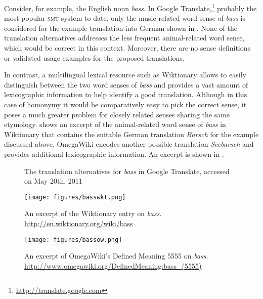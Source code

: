 \documentclass[output=paper]{LSP/langsci}
\begin{document}
 Consider, for example, the English noun \textit{bass}. In Google Translate,\footnote{\url{http://translate.google.com}} probably the most popular \textsc{smt} system to date, only the music-related word sense of \textit{bass} is considered for the example translation into German shown in . None of the translation alternatives addresses the less frequent animal-related word sense, which would be correct in this context. Moreover, there are no sense definitions or validated usage examples for the proposed translations.

In contrast, a multilingual lexical resource such as Wiktionary allows to easily distinguish between the two word senses of \textit{bass} and provides a vast amount of lexicographic information to help identify a good translation.  Although in this case of homonymy it would be comparatively easy to pick the correct sense, it poses a much greater problem for closely related senses sharing the same etymology.  shows an excerpt of the animal-related word sense of \textit{bass} in Wiktionary that contains the suitable German translation \textit{Barsch} for the example discussed above. OmegaWiki encodes another possible translation \textit{Seebarsch} and provides additional lexicographic information. An excerpt is shown in .
 
\begin{figure*} 
 \begin{center}
 \caption{\label{google}
The translation alternatives for \textit{bass} in Google Translate, accessed on May 20th, 2011} 
 \end{center}
\end{figure*}



\begin{figure}
  
  \texttt{[image: figures/basswkt.png]}
  \caption{An excerpt of the Wiktionary entry on \textit{bass}. \url{http://en.wiktionary.org/wiki/bass}}
  \label{fig:basswkt}
\end{figure}

\begin{figure}
  
  \texttt{[image: figures/bassow.png]}
  \caption{An excerpt of OmegaWiki's Defined Meaning 5555 on \textit{bass}. \url{http://www.omegawiki.org/DefinedMeaning:bass_(5555)}}
  \label{fig:bassow}
\end{figure}
\end{document}
